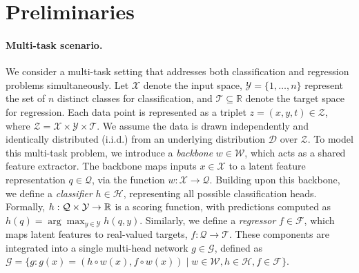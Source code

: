 \section{Preliminaries}


\paragraph{Multi-task scenario.} \label{prel:multi}
We consider a multi-task setting that addresses both classification and regression problems simultaneously. Let \(\mathcal{X}\) denote the input space, \(\mathcal{Y} = \{1, \ldots, n\}\) represent the set of \(n\) distinct classes for classification, and \(\mathcal{T} \subseteq \mathbb{R}\) denote the target space for regression. Each data point is represented as a triplet \(z = (x, y, t) \in \mathcal{Z}\), where \(\mathcal{Z} = \mathcal{X} \times \mathcal{Y} \times \mathcal{T}\). We assume the data is drawn independently and identically distributed (i.i.d.) from an underlying distribution \(\mathcal{D}\) over \(\mathcal{Z}\). To model this multi-task problem, we introduce a \emph{backbone} \(w \in \mathcal{W}\), which acts as a shared feature extractor. The backbone maps inputs \(x \in \mathcal{X}\) to a latent feature representation \(q \in \mathcal{Q}\), via the function \(w: \mathcal{X} \to \mathcal{Q}\). Building upon this backbone, we define a \emph{classifier} \(h \in \mathcal{H}\), representing all possible classification heads. Formally, \(h: \mathcal{Q} \times \mathcal{Y} \to \mathbb{R}\) is a scoring function, with predictions computed as \(h(q) = \arg\max_{y \in \mathcal{Y}} h(q, y)\). Similarly, we define a \emph{regressor} \(f \in \mathcal{F}\), which maps latent features to real-valued targets, \(f: \mathcal{Q} \to \mathcal{T}\). These components are integrated into a single multi-head network \(g \in \mathcal{G}\), defined as $\mathcal{G} = \{ g : g(x) = (h \circ w(x), f \circ w(x)) \mid w \in \mathcal{W}, h \in \mathcal{H}, f \in \mathcal{F} \}$.
